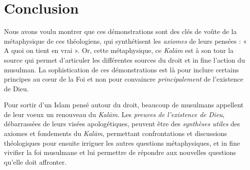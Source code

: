 \section{Conclusion}

Nous avons voulu montrer que ces démonstrations sont des clés de voûte de la métaphysique de ces théologiens, qui synthétisent les \textit{axiomes} de leurs pensées : « A quoi on tient en vrai ». Or, cette métaphysique, ce \emph{Kalām} est à son tour la source qui permet d’articuler les différentes sources du droit et in fine l’action du musulman.
La sophistication de ces démonstrations est là pour inclure certains principes au cœur de la Foi et non pour convaincre \textit{principalement} de l’existence de Dieu. 

Pour sortir d'un Islam pensé autour du droit, beaucoup de musulmans appellent de leur voeux un renouveau du \emph{Kalām}. Les \textit{preuves de l'existence de Dieu}, débarrassées de leurs visées apologétiques, peuvent être des \textit{synthèses utiles} des axiomes et fondements du \emph{Kalām}, permettant confrontations et discussions théologiques pour ensuite irriguer les autres questions métaphysiques, et in fine vivifier la foi musulmane et lui permettre de répondre aux nouvelles questions qu'elle doit affronter. 
	
